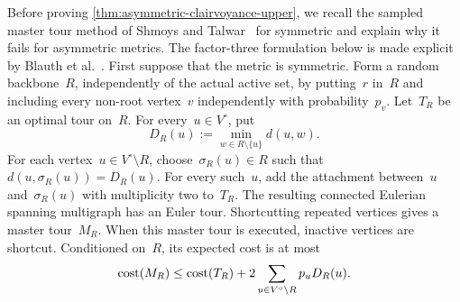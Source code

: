 \documentclass[12pt,a4paper,oneside]{report}
\begin{document}
Before proving \cref{thm:asymmetric-clairvoyance-upper}, we recall the sampled
master tour method of Shmoys and Talwar~\cite{Shmoys2008} for symmetric
\StochTSP{} and explain why it fails for asymmetric metrics.  The factor-three
formulation below is made explicit by Blauth et
al.~\cite[Section~1.1]{Blauth2024}.  First suppose that the metric is
symmetric.  Form a random backbone~$R$, independently of the actual active
set, by putting~$r$ in~$R$ and including every non-root vertex~$v$
independently with probability~$p_v$.  Let~$T_R$ be an optimal tour on~$R$.
For every~$u\in V^\circ$, put
\[
    D_R(u):=\min_{w\in R\setminus\{u\}}d(u,w).
\]
For each vertex~$u\in V^\circ\setminus R$, choose~$\sigma_R(u)\in R$ such
that $d(u,\sigma_R(u))=D_R(u)$.  For every such~$u$, add the attachment
between~$u$ and~$\sigma_R(u)$ with multiplicity two to~$T_R$.  The resulting
connected Eulerian spanning multigraph has an Euler tour.  Shortcutting
repeated vertices gives a master tour~$M_R$.  When this master tour is
executed, inactive vertices are shortcut.  Conditioned on~$R$, its expected
cost is at most
\begin{equation}\label{eq:symmetric-master-route}
    \operatorname{cost}(M_R)
    \le \operatorname{cost}(T_R)
       +2\sum_{u\in V^\circ\setminus R}p_uD_R(u).
\end{equation}
\end{document}
